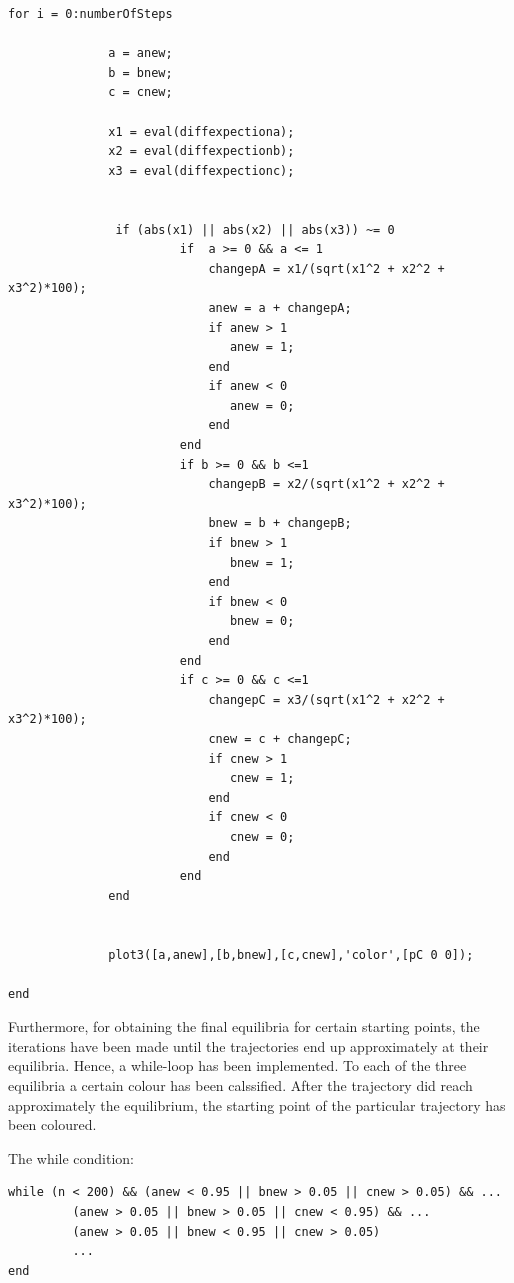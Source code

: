\documentclass[11pt]{article}
\begin{document}
\begin{verbatim}
for i = 0:numberOfSteps

              a = anew;
              b = bnew;
              c = cnew;

              x1 = eval(diffexpectiona);    
              x2 = eval(diffexpectionb);    
              x3 = eval(diffexpectionc);

                    
               if (abs(x1) || abs(x2) || abs(x3)) ~= 0
                        if  a >= 0 && a <= 1
                            changepA = x1/(sqrt(x1^2 + x2^2 + x3^2)*100);
                            anew = a + changepA;
                            if anew > 1
                               anew = 1;
                            end
                            if anew < 0
                               anew = 0;
                            end
                        end
                        if b >= 0 && b <=1
                            changepB = x2/(sqrt(x1^2 + x2^2 + x3^2)*100);
                            bnew = b + changepB;
                            if bnew > 1
                               bnew = 1;
                            end
                            if bnew < 0
                               bnew = 0;
                            end
                        end
                        if c >= 0 && c <=1
                            changepC = x3/(sqrt(x1^2 + x2^2 + x3^2)*100);
                            cnew = c + changepC;
                            if cnew > 1
                               cnew = 1;
                            end
                            if cnew < 0
                               cnew = 0;
                            end
                        end
              end
                    
                    
              plot3([a,anew],[b,bnew],[c,cnew],'color',[pC 0 0]);
                    
end
\end{verbatim}

Furthermore, for obtaining the final equilibria for certain starting points, the iterations have been made until the trajectories end up approximately at their equilibria. Hence, a while-loop has been implemented. To each of the three equilibria a certain colour has been calssified. After the trajectory did reach approximately the equilibrium, the starting point of the particular trajectory has been coloured.
\newline

The while condition:
\begin{verbatim}
while (n < 200) && (anew < 0.95 || bnew > 0.05 || cnew > 0.05) && ...
         (anew > 0.05 || bnew > 0.05 || cnew < 0.95) && ...
         (anew > 0.05 || bnew < 0.95 || cnew > 0.05)
         ...
end
\end{verbatim}
\end{document}
